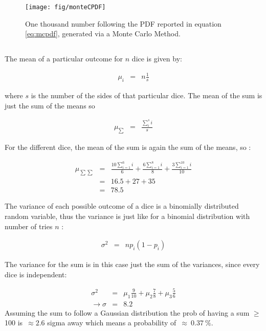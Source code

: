 \documentclass[twocolumn]{article}
\begin{document}
		\begin{figure}[h!]
			\begin{center}
				\texttt{[image: fig/monteCPDF]}
			\end{center}
			\caption{One thousand number following the PDF reported in equation \ref{eq:mcpdf}, generated via a Monte Carlo Method.}
			\label{fig:figure1}
		\end{figure}

	\subsection{}
	\label{sub:dice}
		The mean of a particular outcome for $n$ dice is given by: 

		\begin{eqnarray}
		\mu_{i} &=& n \frac{1}{s}
		\end{eqnarray}

		where $ s $ is the number of the sides of that particular dice. The mean of the sum is just the sum of the means so 

		\begin{eqnarray}
		\mu_{\sum} &=& \frac{\sum\limits_{i}^{s}i}{s}
		\end{eqnarray}

		For the different dice, the mean of the sum is again the sum of the means, so : 


		\begin{eqnarray}
		\mu_{\sum\sum} &=& \frac{10\sum\limits_{i=1}^{6}i}{6} +\frac{6\sum\limits_{i=1}^{8}i}{8}+\frac{3\sum\limits_{i=1}^{10}i}{10}\\
		&=& 16.5+27+35\\
		&=& 78.5
		\end{eqnarray}


		The variance of each possible outcome of a dice is a binomially distributed random variable, thus the variance is just like for a binomial distribution with number of tries $n$ : 

		\begin{eqnarray}
		\sigma^{2}&=& n p_{i}(1-p_{i})
		\end{eqnarray}

		The variance for the sum is in this case just the sum of the variances, since every dice is independent: 

		\begin{eqnarray}
		\sigma^{2} &=& \mu_{1}\frac{9}{10} + \mu_{2}\frac{7}{8} + \mu_{3}\frac{5}{6}\\
		\rightarrow \sigma &=& 8.2 
		\end{eqnarray}
	    Assuming the sum to follow a Gaussian distribution  the prob of having a sum $\ge$ 100 is~$\approx 2.6$ sigma away which means a probability of~$\approx~0.37~\%$.
\end{document}
